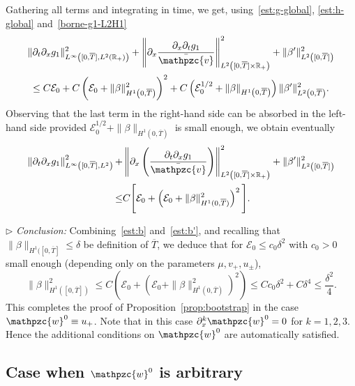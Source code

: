 \documentclass[AHL,Unicode,longabstracts,published]{cedram}
\newcommand{\R}{\mathbb{R}}
\newcommand{\p}{\partial}
\newcommand{\bv}{\bar{\mathpzc{v}}}
\newcommand{\cE}{\mathcal E}
\newcommand{\tw}{\mathpzc{w}}
\begin{document}
Gathering all terms and integrating in time, we get, using~\eqref{est:g-global}, \eqref{est:h-global} and~\eqref{borne-g1-L2H1}
\begin{multline}
\| \partial_t \p_x g_1\|_{L^\infty\left([0,\overline{T}], L^2(\R_+)\right)}^2 + \left\|\p_x \frac{\p_x \partial_t g_1}{\bv}\right\|^2_{L^2\left([0,\overline{T}]\times \R_+\right)}+ \|\beta'\|_{L^2\left([0,\overline{T}]\right)}^2\\
\leq C\cE_0 + C\left(\cE_0 + \|\beta\|_{H^1\left(0,\overline{T}\right)}^2\right)^2 + C\left(\cE_0^{1/2} + \|\beta\|_{H^1\left(0,\overline{T}\right)}\right)\|\beta'\|_{L^2\left(0,\overline{T}\right)}^2.
\end{multline}
Observing that the last term in the right-hand side can be absorbed in the left-hand side provided $\cE_0^{1/2} + \|\beta\|_{H^1(0,\overline{T})}$ is small enough, we obtain eventually
\begin{equation}\label{est:b'}
\begin{split}
\left\|\partial_t \partial_x g_1\right\|_{L^\infty\left([0,\overline{T}], L^2\right)}^2 +& \left\|\partial_x \left(\dfrac{\partial_t \partial_x g_1}{\bv} \right) \right\|_{L^2\left([0, \overline{T}] \times \R_+\right)}^2 + \|\beta'\|_{L^2\left([0,\overline{T}]\right)}^2 \\
\leq &C \Bigg[\cE_0 + \left(\cE_0 +\|\beta\|_{H^1(0,\overline{T})}^2\right)^2 \Bigg].
\end{split}
\end{equation}


$\rhd$ \emph{Conclusion:} Combining~\eqref{est:b} and~\eqref{est:b'}, and recalling that $\|\beta\|_{H^1([0, \overline{T}]}\leq \delta$ be definition of $\overline{T}$, we deduce that for $\cE_0 \leq c_0 \delta^2$ with $c_0 > 0$ small enough (depending only on the parameters $\mu, v_+,u_\pm$),
\[
\|\beta\|_{H^1\left([0, \overline{T}]\right)}^2 \leq C \left(\cE_0 + \left(\cE_0 + \|\beta\|_{H^1\left(0,\overline{T}\right)}^2\right)^2\right) \leq C c_0 \delta^2 + C \delta^4 \leq \frac{\delta^2}{4}.
\]
This completes the proof of Proposition~\ref{prop:bootstrap} in the case $\tw^0\equiv u_+$. {Note that in this case $\p_x^k \tw^0=0$ for $k=1,2,3$. Hence the additional conditions on $\tw^0$ are automatically satisfied.}

\subsection{Case when \texorpdfstring{$\tw^0$}{w0} is arbitrary}\label{ssec:w0-qcq}
\end{document}
